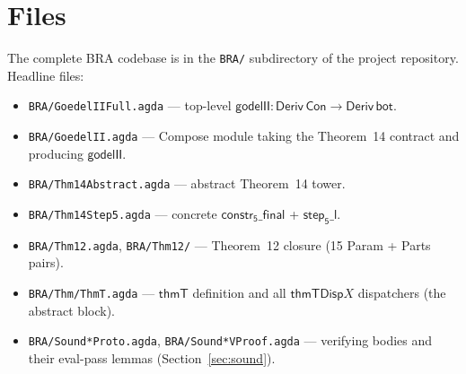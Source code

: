 \documentclass[11pt]{article}
\newcommand{\Deriv}{\mathsf{Deriv}}
\newcommand{\thmT}{\mathsf{thmT}}
\newcommand{\Con}{\mathsf{Con}}
\newcommand{\bot}{\mathsf{bot}}
\begin{document}
\section{Files}

The complete BRA codebase is in the \verb|BRA/| subdirectory of the
project repository.  Headline files:

\begin{itemize}
\item \verb|BRA/GoedelIIFull.agda| --- top-level
  $\mathsf{godelII} : \Deriv\,\Con \to \Deriv\,\bot$.
\item \verb|BRA/GoedelII.agda| --- Compose module taking the
  Theorem~14 contract and producing $\mathsf{godelII}$.
\item \verb|BRA/Thm14Abstract.agda| --- abstract Theorem~14 tower.
\item \verb|BRA/Thm14Step5.agda| --- concrete
  $\mathsf{constr_5\_final}$ + $\mathsf{step_5\_l}$.
\item \verb|BRA/Thm12.agda|, \verb|BRA/Thm12/| --- Theorem~12 closure
  (15 Param + Parts pairs).
\item \verb|BRA/Thm/ThmT.agda| --- $\thmT$ definition and all
  $\mathsf{thmTDisp}X$ dispatchers (the abstract block).
\item \verb|BRA/Sound*Proto.agda|,
      \verb|BRA/Sound*VProof.agda| --- verifying bodies and their
  eval-pass lemmas (Section~\ref{sec:sound}).
\end{itemize}
\end{document}
